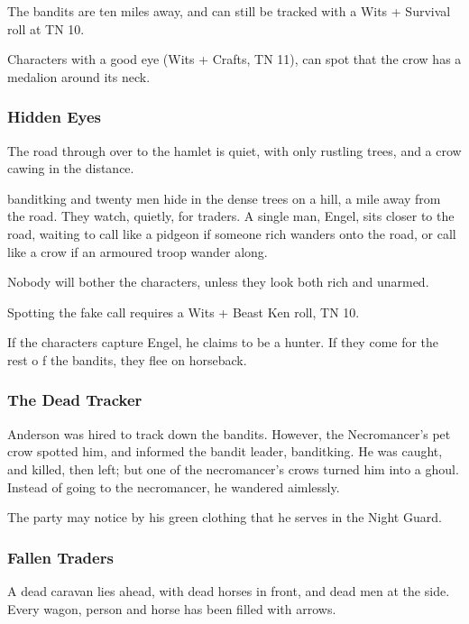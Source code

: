 The bandits are ten miles away, and can still be tracked with a Wits + Survival roll at TN 10.

Characters with a good eye (Wits + Crafts, TN 11), can spot that the crow has a medalion around its neck.

\subsubsection{Hidden Eyes}
\begin{boxtext}
The road through over to the hamlet is quiet, with only rustling trees, and a crow cawing in the distance.
\end{boxtext}

\gls{banditking} and twenty men hide in the dense trees on a hill, a mile away from the road.  They watch, quietly, for traders.  A single man, Engel, sits closer to the road, waiting to call like a pidgeon if someone rich wanders onto the road, or call like a crow if an armoured troop wander along.

Nobody will bother the characters, unless they look both rich and unarmed.

Spotting the fake call requires a Wits + Beast Ken roll, TN 10.

If the characters capture Engel, he claims to be a hunter.  If they come for the rest o f the bandits, they flee on horseback.


\humansoldier

\subsubsection{The Dead Tracker}
Anderson was hired to track down the bandits.  However, the Necromancer's pet crow spotted him, and informed the bandit leader, \gls{banditking}.  He was caught, and killed, then left; but one of the necromancer's crows turned him into a ghoul.  Instead of going to the necromancer, he wandered aimlessly.

The party may notice by his green clothing that he serves in the Night Guard.

\ghoul

\subsubsection{Fallen Traders}

\begin{boxtext}
	A dead caravan lies ahead, with dead horses in front, and dead men at the side.  Every wagon, person and horse has been filled with arrows.
\end{boxtext}

